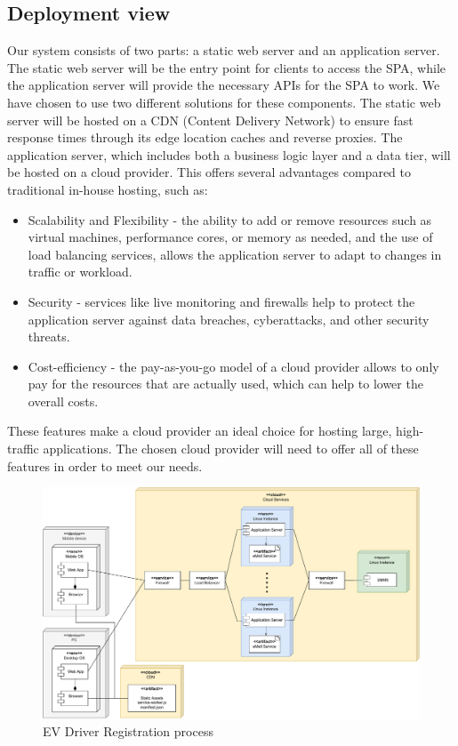 \subsection{Deployment view}

Our system consists of two parts: a static web server and an application server. The static web server will be the entry point for clients to access the SPA, while the application server will provide the necessary APIs for the SPA to work. We have chosen to use two different solutions for these components. The static web server will be hosted on a CDN (Content Delivery Network) to ensure fast response times through its edge location caches and reverse proxies. The application server, which includes both a business logic layer and a data tier, will be hosted on a cloud provider.
This offers several advantages compared to traditional in-house hosting, such as:
\begin{itemize}
    \item Scalability and Flexibility - the ability to add or remove resources such as virtual machines, performance cores, or memory as needed, and the use of load balancing services, allows the application server to adapt to changes in traffic or workload.
    \item Security - services like live monitoring and firewalls help to protect the application server against data breaches, cyberattacks, and other security threats.
    \item Cost-efficiency - the pay-as-you-go model of a cloud provider allows to only pay for the resources that are actually used, which can help to lower the overall costs.
\end{itemize}
These features make a cloud provider an ideal choice for hosting large, high-traffic applications. The chosen cloud provider will need to offer all of these features in order to meet our needs.

\begin{figure}[H]
    \centering
    \includegraphics[scale=0.55]{src/deploymentDiagram/deployment_diagram.pdf}
    \caption{EV Driver Registration process}
\end{figure}

